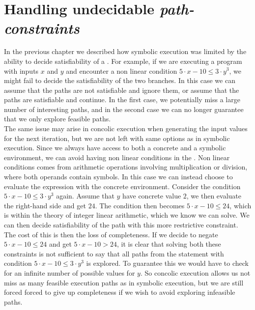 \section{Handling undecidable \emph{path-constraints}} 
In the previous chapter we described how symbolic execution was limited by the ability to decide satisfiability of a \pc. For example, if we are executing a program with inputs $x$ and $y$ and encounter a non linear condition $ 5\cdot x - 10 \leq 3 \cdot y^3$, we might fail to decide the satisfiability of the two branches. In this case we can assume that the paths are not satisfiable and ignore them, or assume that the paths are satisfiable and continue. In the first case, we potentially miss a large number of interesting paths, and in the second case we can no longer guarantee that we only explore feasible paths.\\
The same issue may arise in concolic execution when generating the input values for the next iteration, but we are not left with same options as in symbolic execution. Since we always have access to both a concrete and a symbolic environment, we can avoid having non linear conditions in the \pc. Non linear conditions comes from arithmetic operations involving multiplication or division, where both operands contain symbols. In this case we can instead choose to evaluate the expression with the concrete environment\cite{Godefroid:2005:DDA:1064978.1065036}. Consider the condition $ 5\cdot x - 10 \leq 3 \cdot y^3$ again. Assume that $y$ have concrete value $2$, we then evaluate the right-hand side and get $24$. The condition then becomes $ 5\cdot x - 10 \leq 24$, which is within the theory of integer linear arithmetic, which we know we can solve. We can then decide satisfiability of the path with this more restrictive constraint. The cost of this is then the loss of completeness. If we decide to negate $5\cdot x - 10 \leq 24$ and get $5\cdot x - 10 > 24$, it is clear that solving both these constraints is not sufficient to say that all paths from the statement with condition $ 5\cdot x - 10 \leq 3 \cdot y^3$ is explored. To guarantee this we would have to check for an infinite number of possible values for $y$. So concolic execution allows us not miss as many feasible execution paths as in symbolic execution, but we are still forced forced to give up completeness if we wish to avoid exploring infeasible paths.